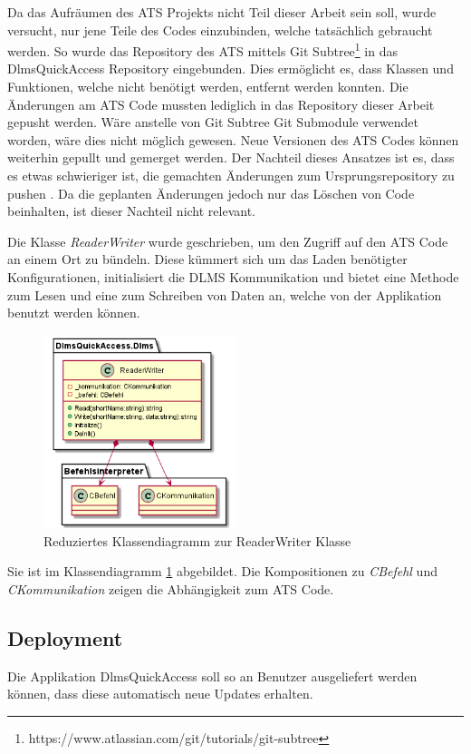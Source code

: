 Da das Aufräumen des \ac{ATS} Projekts nicht Teil dieser Arbeit sein soll, wurde versucht, nur jene Teile des Codes einzubinden, welche tatsächlich gebraucht werden.
So wurde das Repository des \ac{ATS} mittels Git Subtree\footnote{https://www.atlassian.com/git/tutorials/git-subtree} in das DlmsQuickAccess Repository eingebunden. 
Dies ermöglicht es, dass Klassen und Funktionen, welche nicht benötigt werden, entfernt werden konnten.
Die Änderungen am \ac{ATS} Code mussten lediglich in das Repository dieser Arbeit gepusht werden.
Wäre anstelle von Git Subtree Git Submodule verwendet worden, wäre dies nicht möglich gewesen.
Neue Versionen des \ac{ATS} Codes können weiterhin gepullt und gemerget werden. 
Der Nachteil dieses Ansatzes ist es, dass es etwas schwieriger ist, die gemachten Änderungen zum Ursprungsrepository zu pushen \parencite{gitSubtree}.
Da die geplanten Änderungen jedoch nur das Löschen von Code beinhalten, ist dieser Nachteil nicht relevant.

Die Klasse \textit{ReaderWriter} wurde geschrieben, um den Zugriff auf den \ac{ATS} Code an einem Ort zu bündeln.
Diese kümmert sich um das Laden benötigter Konfigurationen, initialisiert die \ac{DLMS} Kommunikation und bietet eine Methode zum Lesen und eine zum Schreiben von Daten an, welche von der Applikation benutzt werden können.
\begin{figure}[H]
   \centering
   \includegraphics[width=0.5\textwidth]{gfx/readerwriter.png}
   \caption{
      Reduziertes Klassendiagramm zur ReaderWriter Klasse
      }
      \label{fig:readerwriter}
\end{figure}
Sie ist im Klassendiagramm \ref{fig:readerwriter} abgebildet.
Die Kompositionen zu \textit{CBefehl} und \textit{CKommunikation} zeigen die Abhängigkeit zum \ac{ATS} Code.

\subsection{Deployment}\label{deployment}
\dq Die Applikation DlmsQuickAccess soll so an Benutzer ausgeliefert werden können, dass diese automatisch neue Updates erhalten.\dq

